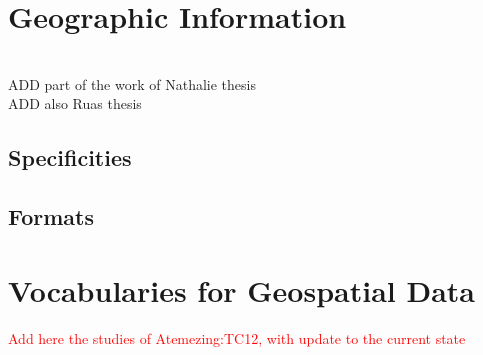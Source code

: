 \section{Geographic Information}
 \\
ADD part of the work of Nathalie thesis \\
ADD also Ruas thesis \\


 \subsection{Specificities}
 \subsection{Formats}

\section{Vocabularies for Geospatial Data}
\textcolor{red}{Add here the studies of Atemezing:TC12, with update to the current state }

